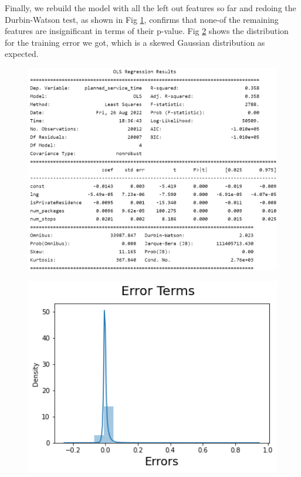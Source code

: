 \documentclass[12pt]{article}
\theoremstyle{plain}
\numberwithin{equation}{section}
\begin{document}
Finally, we rebuild the model with all the left out features so far and  redoing the Durbin-Watson test, as shown in Fig \ref{fig:reg2}, confirms that none-of the remaining features are insignificant in terms of their p-value. Fig \ref{fig:Error} shows the distribution for the training error we got, which is a skewed Gaussian distribution as expected.
\begin{figure}
\centering
\includegraphics[width=14cm]{Images/reg2.png}
\caption{}
\label{fig:reg2}
\end{figure}

\begin{figure}
\centering
\includegraphics[width=12cm]{Images/Error.png}
\caption{}
\label{fig:Error}
\end{figure}
\end{document}
